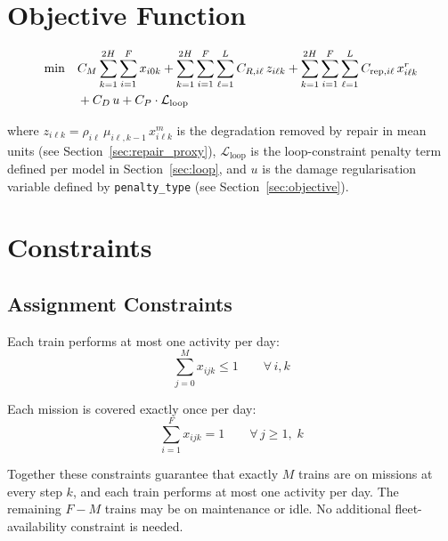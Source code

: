 \documentclass[11pt,a4paper]{article}
\begin{document}
\section{Objective Function}

\begin{align}
\min \quad
  & C_M \sum_{k=1}^{2H} \sum_{i=1}^{F} x_{i0k}
  + \sum_{k=1}^{2H} \sum_{i=1}^{F} \sum_{\ell=1}^{L} C_{R,i\ell}\, z_{i\ell k}
  + \sum_{k=1}^{2H} \sum_{i=1}^{F} \sum_{\ell=1}^{L} C_{\mathrm{rep},i\ell}\, x^r_{i\ell k} \notag \\
  & + C_D\, u
  + C_P \cdot \mathcal{L}_{\mathrm{loop}}
\end{align}

where $z_{i\ell k} = \rho_{i\ell}\,\mu_{i\ell,k-1}\,x^m_{i\ell k}$ is the degradation
removed by repair in mean units (see Section~\ref{sec:repair_proxy}),
$\mathcal{L}_{\mathrm{loop}}$ is the loop-constraint penalty term defined per model
in Section~\ref{sec:loop}, and $u$ is the damage regularisation variable defined by
\texttt{penalty\_type} (see Section~\ref{sec:objective}).

\section{Constraints}

\subsection{Assignment Constraints}

Each train performs at most one activity per day:
\begin{equation}
  \sum_{j=0}^{M} x_{ijk} \leq 1 \qquad \forall\, i,k
\end{equation}

Each mission is covered exactly once per day:
\begin{equation}
  \sum_{i=1}^{F} x_{ijk} = 1 \qquad \forall\, j \geq 1,\; k
\end{equation}

Together these constraints guarantee that exactly $M$ trains are on missions at every
step $k$, and each train performs at most one activity per day. The remaining $F - M$
trains may be on maintenance or idle. No additional fleet-availability constraint is needed.
\end{document}
